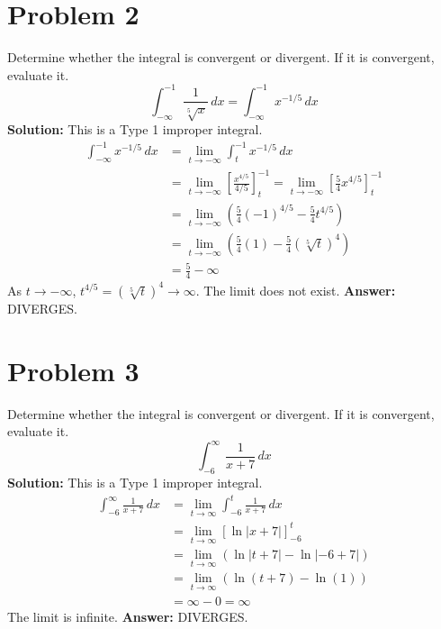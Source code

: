 \documentclass{article}
\begin{document}
\section{Problem 2}
Determine whether the integral is convergent or divergent. If it is convergent, evaluate it.
\[ \int_{-\infty}^{-1} \frac{1}{\sqrt[5]{x}} \,dx = \int_{-\infty}^{-1} x^{-1/5} \,dx \]
\textbf{Solution:}
This is a Type 1 improper integral.
\begin{align*}
    \int_{-\infty}^{-1} x^{-1/5} \,dx &= \lim_{t \to -\infty} \int_{t}^{-1} x^{-1/5} \,dx \\
    &= \lim_{t \to -\infty} \left[ \frac{x^{4/5}}{4/5} \right]_{t}^{-1} = \lim_{t \to -\infty} \left[ \frac{5}{4}x^{4/5} \right]_{t}^{-1} \\
    &= \lim_{t \to -\infty} \left( \frac{5}{4}(-1)^{4/5} - \frac{5}{4}t^{4/5} \right) \\
    &= \lim_{t \to -\infty} \left( \frac{5}{4}(1) - \frac{5}{4}(\sqrt[5]{t})^4 \right) \\
    &= \frac{5}{4} - \infty
\end{align*}
As $t \to -\infty$, $t^{4/5} = (\sqrt[5]{t})^4 \to \infty$. The limit does not exist.
\textbf{Answer:} DIVERGES.

\section{Problem 3}
Determine whether the integral is convergent or divergent. If it is convergent, evaluate it.
\[ \int_{-6}^{\infty} \frac{1}{x+7} \,dx \]
\textbf{Solution:}
This is a Type 1 improper integral.
\begin{align*}
    \int_{-6}^{\infty} \frac{1}{x+7} \,dx &= \lim_{t \to \infty} \int_{-6}^{t} \frac{1}{x+7} \,dx \\
    &= \lim_{t \to \infty} \left[ \ln|x+7| \right]_{-6}^{t} \\
    &= \lim_{t \to \infty} (\ln|t+7| - \ln|-6+7|) \\
    &= \lim_{t \to \infty} (\ln(t+7) - \ln(1)) \\
    &= \infty - 0 = \infty
\end{align*}
The limit is infinite.
\textbf{Answer:} DIVERGES.
\end{document}
